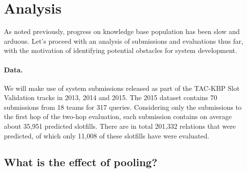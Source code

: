 \section{Analysis}
\label{sec:analysis}

As noted previously, progress on knowledge base population has been slow and arduous.
Let's proceed with an analysis of submissions and evaluations thus far, with the motivation of identifying potential obstacles for system development. 

\paragraph{Data.}
We will make use of system submissions released as part of the TAC-KBP Slot Validation tracks in 2013, 2014 and 2015.
The 2015 dataset contains 70 submissions from 18 teams for 317 queries.
Considering only the submissions to the first hop of the two-hop evaluation,
each submission contains on average about 35,951 predicted slotfills. 
There are in total 201,332 relations that were predicted, of which only 11,008 of these slotfills have were evaluated.

\subsection{What is the effect of pooling?}

